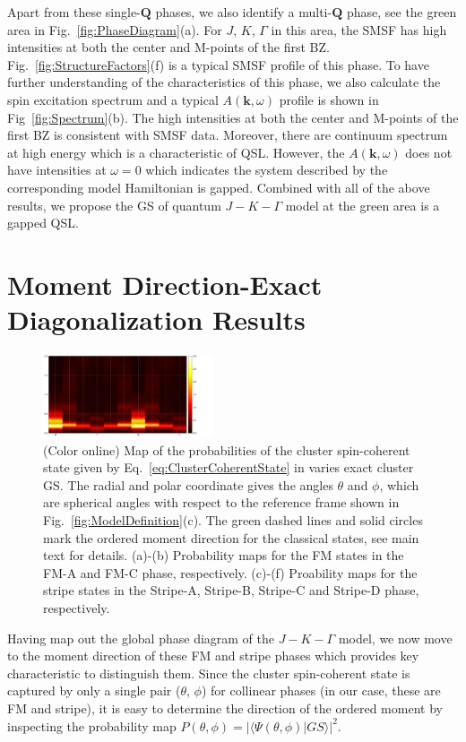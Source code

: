 \documentclass[aps,prb,reprint,amsfonts,amsmath,amssymb,showpacs,groupedaddress,superscriptaddress]{revtex4-1}
\begin{document}
Apart from these single-$\mathbf{Q}$ phases, we also identify a multi-$\mathbf{Q}$ phase, see the green area in Fig.~\ref{fig:PhaseDiagram}(a). For $J$, $K$, $\Gamma$ in this area, the SMSF has high intensities at both the center and M-points of the first BZ. Fig.~\ref{fig:StructureFactors}(f) is a typical SMSF profile of this phase. To have further understanding of the characteristics of this phase, we also calculate the spin excitation spectrum and a typical $A(\mathbf{k}, \omega)$ profile is shown in Fig~\ref{fig:Spectrum}(b). The high intensities at both the center and M-points of the first BZ is consistent with SMSF data. Moreover, there are continuum spectrum at high energy which is a characteristic of QSL. However, the $A(\mathbf{k}, \omega)$ does not have intensities at $\omega = 0$ which indicates the system described by the corresponding model Hamiltonian is gapped. Combined with all of the above results, we propose the GS of quantum $J-K-\Gamma$ model at the green area is a gapped QSL.

\section{\label{sec:SectionV}Moment Direction-Exact Diagonalization Results}
\begin{figure}
    \includegraphics[width=0.45\textwidth]{Fig5.pdf}
    \caption{\label{fig:Proabilities}(Color online) Map of the probabilities of the cluster spin-coherent state given by Eq.~\eqref{eq:ClusterCoherentState} in varies exact cluster GS. The radial and polar coordinate gives the angles $\theta$ and $\phi$, which are spherical angles with respect to the reference frame shown in Fig.~\ref{fig:ModelDefinition}(c). The green dashed lines and solid circles mark the ordered moment direction for the classical states, see main text for details. (a)-(b) Probability maps for the FM states in the FM-A and FM-C phase, respectively. (c)-(f) Proability maps for the stripe states in the Stripe-A, Stripe-B, Stripe-C and Stripe-D phase, respectively.}
\end{figure}

Having map out the global phase diagram of the $J-K-\Gamma$ model, we now move to the moment direction of these FM and stripe phases which provides key characteristic to distinguish them. Since the cluster spin-coherent state is captured by only a single pair ($\theta$, $\phi$) for collinear phases (in our case, these are FM and stripe), it is easy to determine the direction of the ordered moment by inspecting the probability map $P(\theta, \phi) = | \langle \Psi (\theta, \phi) | GS \rangle |^2$.
\end{document}
